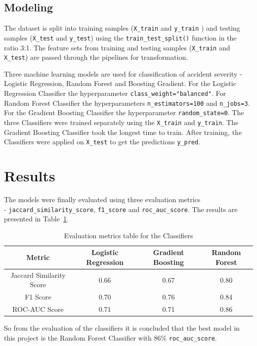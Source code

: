 \documentclass[12pt]{article}
\begin{document}
\subsection{Modeling}
The dataset is split into training samples (\verb|X_train| and \verb|y_train| ) and testing samples (\verb|X_test| and \verb|y_test|) using the \verb|train_test_split()| function in the ratio 3:1. The feature sets from training and testing samples (\verb|X_train| and \verb|X_test|) are passed through the pipelines for transformation.

Three machine learning models are used for classification of accident severity - Logistic Regression, Random Forest and Boosting Gradient. For the Logistic Regression Classifier the hyperparameter \verb|class_weight="balanced"|. For Random Forest Classifier the hyperparameters \verb|n_estimators=100| and \verb|n_jobs=3|. For the Gradient Boosting Classifier the hyperparameter \verb|random_state=0|. The three Classifiers were trained separately using the \verb|X_train| and \verb|y_train|. The Gradient Boosting Classifier took the longest time to train. After training, the Classifiers were applied on \verb|X_test| to get the predictions \verb|y_pred|.

\section{Results}
The models were finally evaluated using three evaluation metrics \\- \verb|jaccard_similarity_score|, \verb|f1_score| and \verb|roc_auc_score|. The results are presented in Table~\ref{Tab1}.
\begin{center}
\begin{table}[h!]
\begin{tabular}{|c|c|c|c|}
\hline
Metric & Logistic Regression & Gradient Boosting & Random Forest \\
\hline
Jaccard Similarity Score & 0.66 & 0.67 & 0.80 \\
\hline
F1 Score & 0.70 & 0.76 & 0.84 \\
\hline
ROC-AUC Score & 0.71 & 0.71 & 0.86 \\
\hline
\end{tabular}
\caption{Evaluation metrics table for the Classifiers}
\label{Tab1}
\end{table}
\end{center}
So from the evaluation of the classifiers it is concluded that the best model in this project is the Random Forest Classifier with 86$\%$ \verb|roc_auc_score|.
\end{document}
